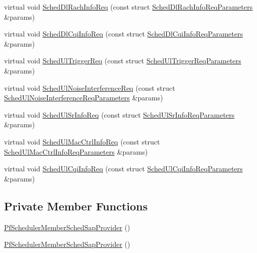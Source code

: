 \begin{DoxyCompactItemize}
\item 
virtual void \hyperlink{classns3_1_1PfSchedulerMemberSchedSapProvider_acf64bf7a9d2bfc17b1ad267d77e5fd73}{Sched\+Dl\+Rach\+Info\+Req} (const struct \hyperlink{structns3_1_1FfMacSchedSapProvider_1_1SchedDlRachInfoReqParameters}{Sched\+Dl\+Rach\+Info\+Req\+Parameters} \&params)
\item 
virtual void \hyperlink{classns3_1_1PfSchedulerMemberSchedSapProvider_a8da88fc6e6311f066ce56646ae3170a5}{Sched\+Dl\+Cqi\+Info\+Req} (const struct \hyperlink{structns3_1_1FfMacSchedSapProvider_1_1SchedDlCqiInfoReqParameters}{Sched\+Dl\+Cqi\+Info\+Req\+Parameters} \&params)
\item 
virtual void \hyperlink{classns3_1_1PfSchedulerMemberSchedSapProvider_a7c42b77ff0c6ddc127fc1fa42f1511fe}{Sched\+Ul\+Trigger\+Req} (const struct \hyperlink{structns3_1_1FfMacSchedSapProvider_1_1SchedUlTriggerReqParameters}{Sched\+Ul\+Trigger\+Req\+Parameters} \&params)
\item 
virtual void \hyperlink{classns3_1_1PfSchedulerMemberSchedSapProvider_af463ee111b1b6fe6f6d92a2aeec2698f}{Sched\+Ul\+Noise\+Interference\+Req} (const struct \hyperlink{structns3_1_1FfMacSchedSapProvider_1_1SchedUlNoiseInterferenceReqParameters}{Sched\+Ul\+Noise\+Interference\+Req\+Parameters} \&params)
\item 
virtual void \hyperlink{classns3_1_1PfSchedulerMemberSchedSapProvider_a0d9ad2e0662995b3a0f8e07325fa696c}{Sched\+Ul\+Sr\+Info\+Req} (const struct \hyperlink{structns3_1_1FfMacSchedSapProvider_1_1SchedUlSrInfoReqParameters}{Sched\+Ul\+Sr\+Info\+Req\+Parameters} \&params)
\item 
virtual void \hyperlink{classns3_1_1PfSchedulerMemberSchedSapProvider_a2386bbf38880d78b2d051020deb3bce6}{Sched\+Ul\+Mac\+Ctrl\+Info\+Req} (const struct \hyperlink{structns3_1_1FfMacSchedSapProvider_1_1SchedUlMacCtrlInfoReqParameters}{Sched\+Ul\+Mac\+Ctrl\+Info\+Req\+Parameters} \&params)
\item 
virtual void \hyperlink{classns3_1_1PfSchedulerMemberSchedSapProvider_ac0c6cf4eea70fcfb7f7e439baeb1bada}{Sched\+Ul\+Cqi\+Info\+Req} (const struct \hyperlink{structns3_1_1FfMacSchedSapProvider_1_1SchedUlCqiInfoReqParameters}{Sched\+Ul\+Cqi\+Info\+Req\+Parameters} \&params)
\end{DoxyCompactItemize}
\subsection*{Private Member Functions}
\begin{DoxyCompactItemize}
\item 
\hyperlink{classns3_1_1PfSchedulerMemberSchedSapProvider_a47f9a7d673c4873eddf2197294e6c6d8}{Pf\+Scheduler\+Member\+Sched\+Sap\+Provider} ()
\item 
\hyperlink{classns3_1_1PfSchedulerMemberSchedSapProvider_a47f9a7d673c4873eddf2197294e6c6d8}{Pf\+Scheduler\+Member\+Sched\+Sap\+Provider} ()
\end{DoxyCompactItemize}
